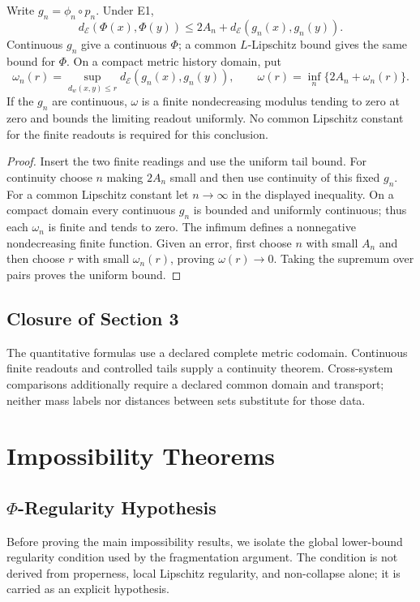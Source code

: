 \begin{proposition}\label{prop:metric-compat}
Write $g_n=\phi_n\circ p_n$. Under E1,
\[
d_{\mathcal E}(\Phi(x),\Phi(y))\leq2A_n+d_{\mathcal E}(g_n(x),g_n(y)).
\]
Continuous $g_n$ give a continuous $\Phi$; a common $L$-Lipschitz bound gives
the same bound for $\Phi$. On a compact metric history domain, put
\[
 \omega_n(r)=\sup_{d_w(x,y)\leq r}d_{\mathcal E}(g_n(x),g_n(y)),\qquad
 \omega(r)=\inf_n\{2A_n+\omega_n(r)\}.
\]
If the $g_n$ are continuous, $\omega$ is a finite nondecreasing modulus tending
to zero at zero and bounds the limiting readout uniformly. No common
Lipschitz constant for the finite readouts is required for this conclusion.
\end{proposition}
\begin{proof}
Insert the two finite readings and use the uniform tail bound. For continuity
choose $n$ making $2A_n$ small and then use continuity of this fixed $g_n$.
For a common Lipschitz constant let $n\to\infty$ in the displayed inequality.
On a compact domain every continuous $g_n$ is bounded and uniformly continuous;
thus each $\omega_n$ is finite and tends to zero. The infimum defines a
nonnegative nondecreasing finite function. Given an error, first choose $n$
with small $A_n$ and then choose $r$ with small $\omega_n(r)$, proving
$\omega(r)\to0$. Taking the supremum over pairs proves the uniform bound.
\end{proof}

\subsection{Closure of Section 3}
The quantitative formulas use a declared complete metric codomain. Continuous finite readouts and controlled tails supply a continuity theorem. Cross-system comparisons additionally require a declared common domain and transport; neither mass labels nor distances between sets substitute for those data.

\section{Impossibility Theorems}

\subsection{\texorpdfstring{$\Phi$}{Phi}-Regularity Hypothesis}

Before proving the main impossibility results, we isolate the global lower-bound regularity condition used by the fragmentation argument. The condition is not derived from properness, local Lipschitz regularity, and non-collapse alone; it is carried as an explicit hypothesis.

